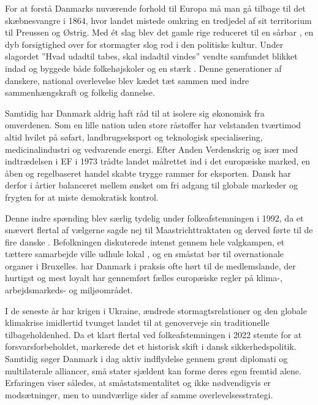 For at forstå Danmarks nuværende forhold til Europa må man gå tilbage til det skæbnesvangre  i 1864, hvor landet mistede omkring en tredjedel af sit territorium til Preussen og Østrig. Med ét slag blev det gamle rige reduceret til en sårbar ,  en dyb forsigtighed over for stormagter slog rod i den politiske kultur. Under slagordet ”Hvad udadtil tabes, skal indadtil vindes” vendte samfundet blikket indad og byggede både folkehøjskoler og en stærk . Denne   generationer af danskere,  national overlevelse blev kædet tæt sammen med indre sammenhængskraft og folkelig dannelse.

Samtidig har Danmark aldrig haft råd til at isolere sig økonomisk fra omverdenen. Som en lille nation uden store råstoffer har velstanden tværtimod altid hvilet på søfart, landbrugseksport og teknologisk specialisering,  medicinalindustri og vedvarende energi. Efter Anden Verdenskrig og især med indtrædelsen i EF i 1973 trådte landet målrettet ind i det europæiske marked,  en åben og regelbaseret handel skabte trygge rammer for eksporten. Dansk  har derfor i årtier balanceret mellem ønsket om fri adgang til globale markeder og frygten for at miste demokratisk kontrol.

Denne indre spænding blev særlig tydelig under folkeafstemningen i 1992, da et snævert flertal af vælgerne sagde nej til Maastrichttraktaten og derved førte til de fire danske . Befolkningen diskuterede intenst gennem hele valgkampen,  et tættere samarbejde ville udhule lokal , og  en småstat bør   til overnationale organer i Bruxelles.  har Danmark i praksis ofte hørt til de medlemslande, der hurtigst og mest loyalt har gennemført fælles europæiske regler på klima-, arbejdsmarkeds- og miljøområdet.

I de seneste år har krigen i Ukraine, ændrede stormagtsrelationer og den globale klimakrise imidlertid tvunget landet til at genoverveje sin traditionelle tilbageholdenhed. Da et klart flertal ved folkeafstemningen i 2022 stemte for at  forsvarsforbeholdet, markerede det et historisk skift i dansk sikkerhedspolitik. Samtidig søger Danmark i dag aktiv indflydelse gennem grønt diplomati og multilaterale alliancer,  små stater sjældent kan forme deres egen fremtid alene. Erfaringen viser således, at småstatsmentalitet og  ikke nødvendigvis er modsætninger, men to uundværlige sider af samme overlevelsesstrategi.


